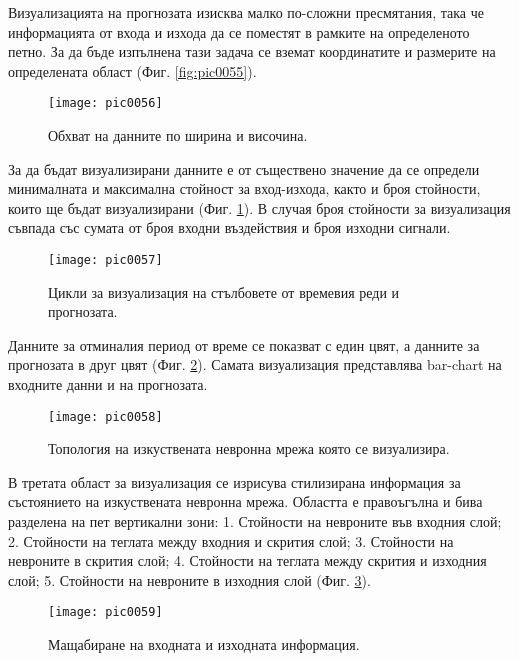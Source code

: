 Визуализацията на прогнозата изисква малко по-сложни пресмятания, така че информацията от входа и изхода да се поместят в рамките на определеното петно. За да бъде изпълнена тази задача се вземат координатите и размерите на определената област (Фиг. \ref{fig:pic0055}). 

\begin{figure}[h]
  \centering
  \texttt{[image: pic0056]}
  \caption{Обхват на данните по ширина и височина.}
\label{fig:pic0056}
\end{figure}
\FloatBarrier

За да бъдат визуализирани данните е от съществено значение да се определи минималната и максимална стойност за вход-изхода, както и броя стойности, които ще бъдат визуализирани (Фиг. \ref{fig:pic0056}). В случая броя стойности за визуализация съвпада със сумата от броя входни въздействия и броя изходни сигнали. 

\begin{figure}[h]
  \centering
  \texttt{[image: pic0057]}
  \caption{Цикли за визуализация на стълбовете от времевия реди и прогнозата.}
\label{fig:pic0057}
\end{figure}
\FloatBarrier

Данните за отминалия период от време се показват с един цвят, а данните за прогнозата в друг цвят (Фиг. \ref{fig:pic0057}). Самата визуализация представлява bar-chart на входните данни и на прогнозата. 

\begin{figure}[h]
  \centering
  \texttt{[image: pic0058]}
  \caption{Топология на изкуствената невронна мрежа която се визуализира.}
\label{fig:pic0058}
\end{figure}
\FloatBarrier

В третата област за визуализация се изрисува стилизирана информация за състоянието на изкуствената невронна мрежа. Областта е правоъгълна и бива разделена на пет вертикални зони: 1. Стойности на невроните във входния слой; 2. Стойности на теглата между входния и скрития слой; 3. Стойности на невроните в скрития слой; 4. Стойности на теглата между скрития и изходния слой; 5. Стойности на невроните в изходния слой (Фиг. \ref{fig:pic0058}).

\begin{figure}[h]
  \centering
  \texttt{[image: pic0059]}
  \caption{Мащабиране на входната и изходната информация.}
\label{fig:pic0059}
\end{figure}
\FloatBarrier

